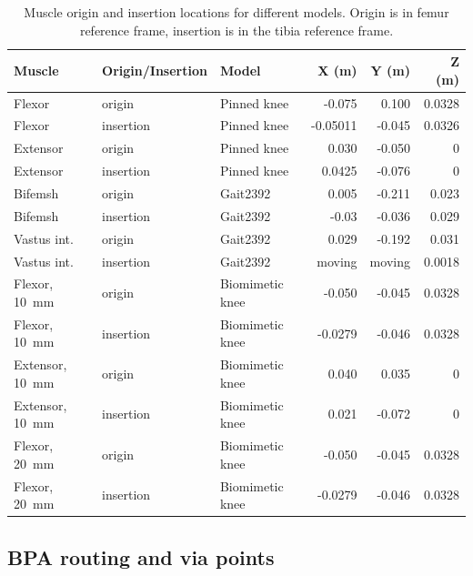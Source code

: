 \documentclass[utf8]{frontiers_suppmat} %
\begin{document}
\begin{table}[htbp]
\caption{Muscle origin and insertion locations for different models. Origin is in femur reference frame, insertion is in the tibia reference frame.}
\label{table:muscle_attachment}
\centering
\begin{tabular}{||l l l r r r||} 
 \hline
 Muscle & Origin/Insertion & Model & X (m) & Y (m) & Z (m)  \\ [0.5ex] 
 \hline\hline
 Flexor & origin & Pinned knee & -0.075 & 0.100 & 0.0328 \\
 Flexor & insertion & Pinned knee & -0.05011 & -0.045 & 0.0326 \\
 Extensor & origin & Pinned knee & 0.030 & -0.050 & 0 \\
 Extensor & insertion & Pinned knee & 0.0425 & -0.076 & 0 \\  
 Bifemsh & origin & Gait2392 & 0.005 & -0.211 & 0.023 \\
 Bifemsh & insertion & Gait2392 & -0.03 & -0.036 & 0.029 \\
 Vastus int. & origin & Gait2392 & 0.029 & -0.192 & 0.031 \\
 Vastus int. & insertion & Gait2392 & moving & moving & 0.0018 \\  
 Flexor, \qty{10}{\milli\metre} & origin & Biomimetic knee & -0.050 & -0.045 & 0.0328 \\
 Flexor, \qty{10}{\milli\metre} & insertion & Biomimetic knee  & -0.0279 & -0.046 & 0.0328 \\
 Extensor, \qty{10}{\milli\metre} & origin & Biomimetic knee  & 0.040 & 0.035 & 0 \\
 Extensor, \qty{10}{\milli\metre} & insertion & Biomimetic knee  & 0.021 & -0.072 & 0 \\
 Flexor, \qty{20}{\milli\metre} & origin & Biomimetic knee  & -0.050 & -0.045 & 0.0328  \\
 Flexor, \qty{20}{\milli\metre} & insertion & Biomimetic knee  & -0.0279 & -0.046 & 0.0328 \\
 \hline
\end{tabular}
\end{table}

\clearpage

\subsection{BPA routing and via points}
\end{document}
